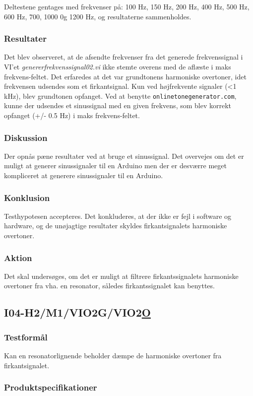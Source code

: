 			Deltestene gentages med frekvenser på: 100 Hz, 150 Hz, 200 Hz, 400 Hz, 500 Hz, 600 Hz, 700, 1000 0g 1200 Hz, og resultaterne sammenholdes. 
			
			\subsubsection{Resultater}
			 Det blev observeret, at de afsendte frekvenser fra det generede frekvenssignal i VI'et \textit{genererfrekvenssignal02.vi} ikke stemte overens med de aflæste i maks frekvens-feltet.  
			 Det erfaredes at det var grundtonens harmoniske overtoner, idet frekvensen udsendes som et firkantsignal. Kun ved højfrekvente signaler (<1 kHz), blev grundtonen opfanget. 
			 Ved at benytte \texttt{onlinetonegenerator.com}, kunne der udsendes et sinussignal med en given frekvens, som blev korrekt opfanget (+/- 0.5 Hz) i maks frekvens-feltet.     
			\subsubsection{Diskussion}
			Der opnås pæne resultater ved at bruge et sinussignal. Det overvejes om det er muligt at generer sinussignaler til en Arduino men der er desværre meget kompliceret at generere sinussignaler til en Arduino.   
			\subsubsection{Konklusion}
			Testhypotesen accepteres. Det konkluderes, at der ikke er fejl i software og hardware, og de unøjagtige resultater skyldes firkantsignalets harmoniske overtoner.  
			\subsubsection{Aktion}
			Det skal undersøges, om det er muligt at filtrere firkantssignalets harmoniske overtoner fra vha. en resonator, således firkantssignalet kan benyttes. 
		
		\subsection{I04-H2/M1/VIO2G/VIO2\underline{O}} 
		\subsubsection{Testformål}
		Kan en resonatorlignende beholder dæmpe de harmoniske overtoner fra firkantsignalet. 
		
		\subsubsection{Produktspecifikationer}
		
